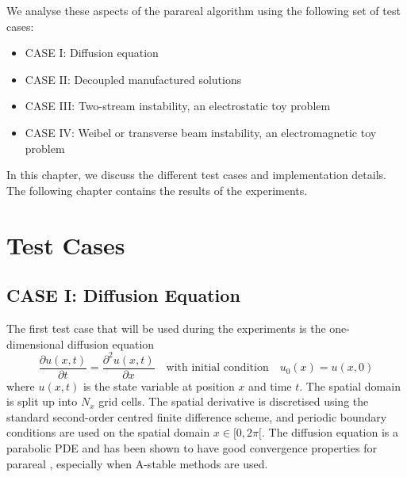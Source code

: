 We analyse these aspects of the parareal algorithm using the following set of test cases:
\begin{itemize}

    \item CASE I: Diffusion equation

    \item CASE II: Decoupled manufactured solutions

    \item CASE III: Two-stream instability, an electrostatic toy problem

    \item CASE IV: Weibel or transverse beam instability, an electromagnetic toy problem
    \end{itemize}

In this chapter, we discuss the different test cases and implementation details. The following chapter contains the results of the experiments.

\section{Test Cases}
\subsection{CASE I: Diffusion Equation}
The first test case that will be used during the experiments is the one-dimensional diffusion equation
\begin{equation}
    \frac{\partial u(x,t)}{\partial t} = \frac{\partial^2 u(x, t)}{\partial x} \quad \text{with initial condition} \quad u_0(x) = u(x,0)
\end{equation}
where $u(x,t)$ is the state variable at position $x$ and time $t$. The spatial domain is split up into $N_x$ grid cells. The spatial derivative is discretised using the standard second-order centred finite difference scheme, and periodic boundary conditions are used on the spatial domain $x \in [0,2\pi[$. The diffusion equation is a parabolic PDE and has been shown to have good convergence properties for parareal \cite{gander_analysis_2007}, especially when A-stable methods are used.

